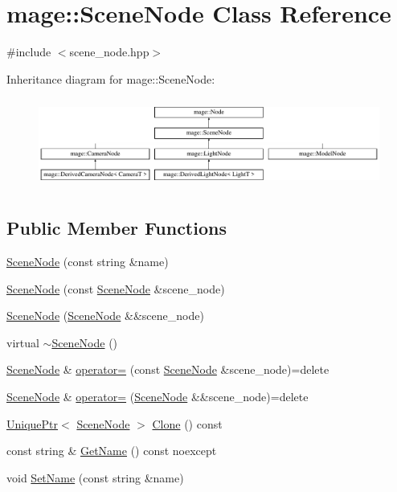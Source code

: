 \hypertarget{classmage_1_1_scene_node}{}\section{mage\+:\+:Scene\+Node Class Reference}
\label{classmage_1_1_scene_node}


{\ttfamily \#include $<$scene\+\_\+node.\+hpp$>$}

Inheritance diagram for mage\+:\+:Scene\+Node\+:\begin{figure}[H]
\begin{center}
\leavevmode
\includegraphics[height=2.986667cm]{classmage_1_1_scene_node}
\end{center}
\end{figure}
\subsection*{Public Member Functions}
\begin{DoxyCompactItemize}
\item 
\hyperlink{classmage_1_1_scene_node_afc138707692a66952484ae2b3c6e15d5}{Scene\+Node} (const string \&name)
\item 
\hyperlink{classmage_1_1_scene_node_a0259a6b573eb633b589cd986b9ec6734}{Scene\+Node} (const \hyperlink{classmage_1_1_scene_node}{Scene\+Node} \&scene\+\_\+node)
\item 
\hyperlink{classmage_1_1_scene_node_acbf94ceadac62f2ccde13d70ce9298d7}{Scene\+Node} (\hyperlink{classmage_1_1_scene_node}{Scene\+Node} \&\&scene\+\_\+node)
\item 
virtual \hyperlink{classmage_1_1_scene_node_a6705beea9c535de3d495762ed06e74dd}{$\sim$\+Scene\+Node} ()
\item 
\hyperlink{classmage_1_1_scene_node}{Scene\+Node} \& \hyperlink{classmage_1_1_scene_node_af4298cbc808139f9da43055afdfe8f7e}{operator=} (const \hyperlink{classmage_1_1_scene_node}{Scene\+Node} \&scene\+\_\+node)=delete
\item 
\hyperlink{classmage_1_1_scene_node}{Scene\+Node} \& \hyperlink{classmage_1_1_scene_node_ae38092ba9ec8449f15b3c1f8285ba500}{operator=} (\hyperlink{classmage_1_1_scene_node}{Scene\+Node} \&\&scene\+\_\+node)=delete
\item 
\hyperlink{namespacemage_a8c307fbcc33bce9b7f2aa4c26c3b95cf}{Unique\+Ptr}$<$ \hyperlink{classmage_1_1_scene_node}{Scene\+Node} $>$ \hyperlink{classmage_1_1_scene_node_ae92f68ce03011b1c1d71421f077a00f8}{Clone} () const
\item 
const string \& \hyperlink{classmage_1_1_scene_node_ab4d72e26370747c06ccb1461f3080b31}{Get\+Name} () const noexcept
\item 
void \hyperlink{classmage_1_1_scene_node_a11a6d53a9ba637813b34347b68ad08d6}{Set\+Name} (const string \&name)
\end{DoxyCompactItemize}
